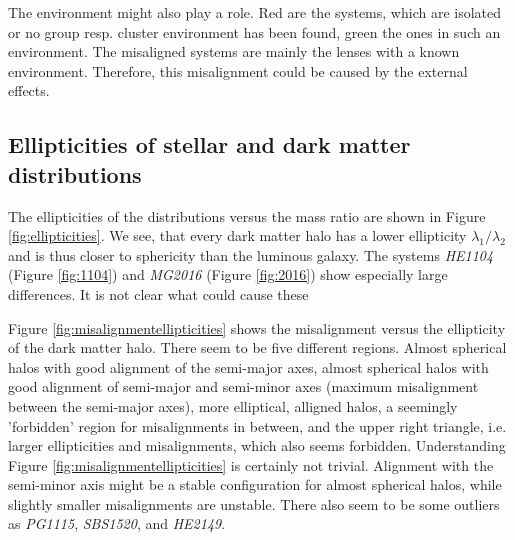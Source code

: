\documentclass[useAMS,usenatbib]{mn2e}
\begin{document}
The environment might also play a role. Red are the systems, which are isolated or no group resp. cluster environment has been found, green the ones in such an environment. The misaligned systems are mainly the lenses with a known environment. Therefore, this misalignment could be caused by the external effects.


\subsection{Ellipticities of stellar and dark matter distributions}
The ellipticities of the distributions versus the mass ratio are shown in Figure \ref{fig:ellipticities}. We see, that every dark matter halo has a lower ellipticity $\lambda_{1}/\lambda_{2}$ and is thus closer to sphericity than the luminous galaxy. The systems \textit{HE1104} (Figure \ref{fig:1104}) and \textit{MG2016} (Figure \ref{fig:2016}) show especially large differences. It is not clear what could cause these

Figure \ref{fig:misalignmentellipticities} shows the misalignment versus the ellipticity of the dark matter halo. There seem to be five different regions. Almost spherical halos with good alignment of the semi-major axes, almost spherical halos with good alignment of semi-major and semi-minor axes (maximum misalignment between the semi-major axes), more elliptical, alligned halos, a seemingly 'forbidden' region for misalignments in between, and the upper right triangle, i.e. larger ellipticities and misalignments, which also seems forbidden. Understanding Figure \ref{fig:misalignmentellipticities} is certainly not trivial. Alignment with the semi-minor axis might be a stable configuration for almost spherical halos, while slightly smaller misalignments are unstable. There also seem to be some outliers as \textit{PG1115}, \textit{SBS1520}, and \textit{HE2149}.
\end{document}
